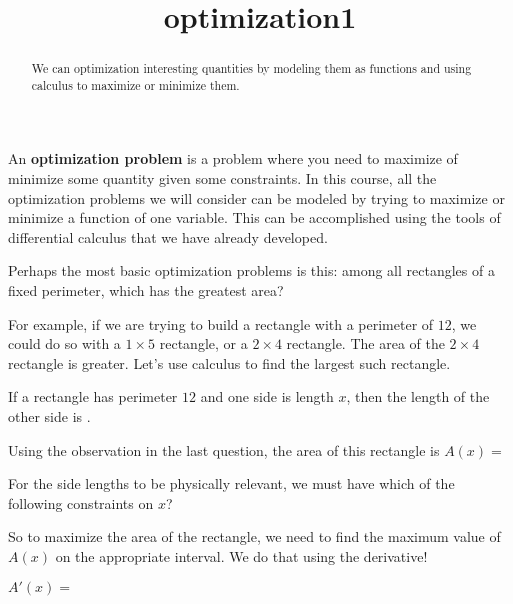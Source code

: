 \documentclass{ximera}
\title{optimization1}
\begin{document}
\begin{abstract}
  We can optimization interesting quantities by modeling them as functions and using calculus to maximize or minimize them.
\end{abstract}

\maketitle


An \textbf{optimization problem} is a problem where you need to maximize of minimize some quantity given some constraints.  In this course, all the optimization problems we will consider can be modeled by trying to maximize or minimize a function of one variable.  This can be accomplished using the tools of differential calculus that we have already developed.

Perhaps the most basic optimization problems is this:  among all rectangles of a fixed perimeter, which has the greatest area?

For example, if we are trying to build a rectangle with a perimeter of $12$, we could do so with a $1 \times 5$ rectangle, or a $2 \times 4$ rectangle.  The area of the $2 \times 4$ rectangle is greater.  Let's use calculus to find the largest such rectangle.

\begin{question}
	If a rectangle has perimeter $12$ and one side is length $x$, then the length of the other side is .
\end{question}

\begin{question}
	Using the observation in the last question, the area of this rectangle is $A(x) =$
\end{question}

\begin{question}
	For the side lengths to be physically relevant, we must have which of the following constraints on $x$?
	\begin{multipleChoice}
  	\end{multipleChoice}
\end{question}

So to maximize the area of the rectangle, we need to find the maximum value of $A(x)$ on the appropriate interval.  We do that using the derivative!

\begin{question}
	$A'(x) =$ 
\end{question}
\end{document}
